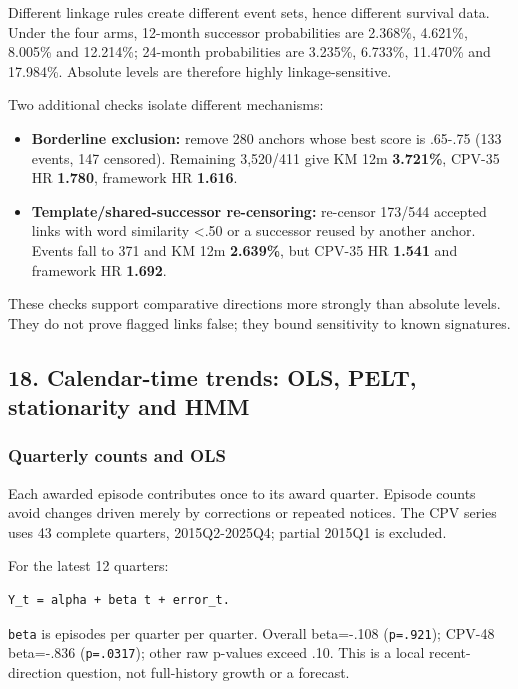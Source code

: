 Different linkage rules create different event sets, hence different
survival data. Under the four arms, 12-month successor probabilities are
2.368\%, 4.621\%, 8.005\% and 12.214\%; 24-month probabilities are
3.235\%, 6.733\%, 11.470\% and 17.984\%. Absolute levels are therefore
highly linkage-sensitive.

Two additional checks isolate different mechanisms:

\begin{itemize}
\tightlist
\item
  \textbf{Borderline exclusion:} remove 280 anchors whose best score is
  .65-.75 (133 events, 147 censored). Remaining 3,520/411 give KM 12m
  \textbf{3.721\%}, CPV-35 HR \textbf{1.780}, framework HR
  \textbf{1.616}.
\item
  \textbf{Template/shared-successor re-censoring:} re-censor 173/544
  accepted links with word similarity \textless.50 or a successor reused
  by another anchor. Events fall to 371 and KM 12m \textbf{2.639\%}, but
  CPV-35 HR \textbf{1.541} and framework HR \textbf{1.692}.
\end{itemize}

These checks support comparative directions more strongly than absolute
levels. They do not prove flagged links false; they bound sensitivity to
known signatures.

\subsection{18. Calendar-time trends: OLS, PELT, stationarity and
HMM}\label{18-calendar-time-trends-ols-pelt-stationarity-and-hmm}

\subsubsection{Quarterly counts and OLS}\label{quarterly-counts-and-ols}

Each awarded episode contributes once to its award quarter. Episode
counts avoid changes driven merely by corrections or repeated notices.
The CPV series uses 43 complete quarters, 2015Q2-2025Q4; partial 2015Q1
is excluded.

For the latest 12 quarters:

\begin{verbatim}
Y_t = alpha + beta t + error_t.
\end{verbatim}

\texttt{beta} is episodes per quarter per quarter. Overall beta=-.108
(\texttt{p=.921}); CPV-48 beta=-.836 (\texttt{p=.0317}); other raw
p-values exceed .10. This is a local recent-direction question, not
full-history growth or a forecast.

